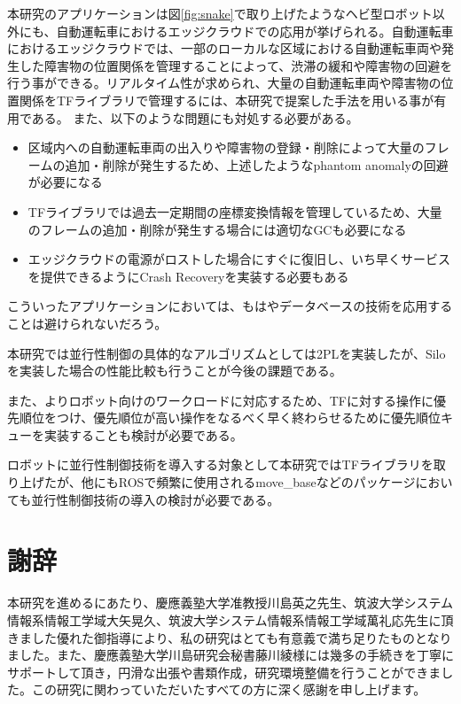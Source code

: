 \documentclass[a4paper]{jreport}	%
\begin{document}
本研究のアプリケーションは図\ref{fig:snake}で取り上げたようなヘビ型ロボット以外にも、自動運転車におけるエッジクラウドでの応用が挙げられる。自動運転車におけるエッジクラウドでは、一部のローカルな区域における自動運転車両や発生した障害物の位置関係を管理することによって、渋滞の緩和や障害物の回避を行う事ができる。リアルタイム性が求められ、大量の自動運転車両や障害物の位置関係をTFライブラリで管理するには、本研究で提案した手法を用いる事が有用である。
また、以下のような問題にも対処する必要がある。
\begin{itemize}
	\item 区域内への自動運転車両の出入りや障害物の登録・削除によって大量のフレームの追加・削除が発生するため、上述したようなphantom anomalyの回避が必要になる
	\item TFライブラリでは過去一定期間の座標変換情報を管理しているため、大量のフレームの追加・削除が発生する場合には適切なGCも必要になる
	\item エッジクラウドの電源がロストした場合にすぐに復旧し、いち早くサービスを提供できるようにCrash Recoveryを実装する必要もある
\end{itemize}

こういったアプリケーションにおいては、もはやデータベースの技術を応用することは避けられないだろう。

本研究では並行性制御の具体的なアルゴリズムとしては2PLを実装したが、Siloを実装した場合の性能比較も行うことが今後の課題である。

また、よりロボット向けのワークロードに対応するため、TFに対する操作に優先順位をつけ、優先順位が高い操作をなるべく早く終わらせるために優先順位キューを実装することも検討が必要である。

ロボットに並行性制御技術を導入する対象として本研究ではTFライブラリを取り上げたが、他にもROSで頻繁に使用されるmove\_baseなどのパッケージにおいても並行性制御技術の導入の検討が必要である。

\chapter*{謝辞}

本研究を進めるにあたり、慶應義塾大学准教授川島英之先生、筑波大学システム情報系情報工学域大矢晃久、筑波大学システム情報系情報工学域萬礼応先生に頂きました優れた御指導により、私の研究はとても有意義で満ち足りたものとなりました。また、慶應義塾大学川島研究会秘書藤川綾様には幾多の手続きを丁寧にサポートして頂き，円滑な出張や書類作成，研究環境整備を行うことができました。この研究に関わっていただいたすべての方に深く感謝を申し上げます。
\end{document}
